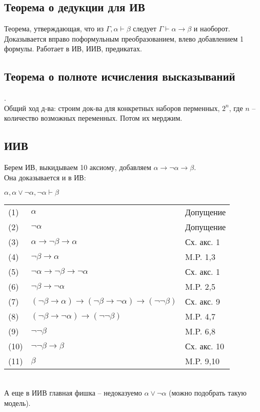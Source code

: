 \subsection{Теорема о дедукции для ИВ}
\label{sec-2-3}
Теорема, утверждающая, что из $\Gamma, \alpha \vdash \beta$ следует $\Gamma \vdash \alpha \to \beta$ и наоборот.\\
Доказывается вправо поформульным преобразованием, влево
добавлением 1 формулы. Работает в ИВ, ИИВ, предикатах.
\subsection{Теорема о полноте исчисления высказываний}
\label{sec-2-4}
.\\
Общий ход д-ва: строим док-ва для конкретных наборов перменных,
$2^n$, где $n$ -- количество возможных переменных. Потом их мерджим.
\subsection{ИИВ}
\label{sec-2-5}
Берем ИВ, выкидываем 10 аксиому, добавляем $\alpha \rightarrow \neg \alpha \rightarrow \beta$.\\
Она доказывается и в ИВ:
\begin{lemma}
$\alpha, \alpha \vee \neg \alpha, \neg \alpha \vdash \beta$
\end{lemma}
\begin{tabular}{lll}
(1) & $\alpha$& Допущение\\
(2) & $\neg \alpha$& Допущение\\
(3) & $\alpha \rightarrow \neg \beta \rightarrow \alpha$& Сх. акс. 1\\
(4) & $\neg \beta \rightarrow \alpha$& M.P. 1,3\\
(5) & $\neg \alpha \rightarrow \neg \beta \rightarrow \neg \alpha$& Сх. акс. 1\\
(6) & $\neg \beta \rightarrow \neg \alpha$& M.P. 2,5\\
(7) & $(\neg \beta \rightarrow \alpha) \rightarrow (\neg \beta \rightarrow \neg \alpha) \rightarrow (\neg \neg \beta)$& Сх. акс. 9\\
(8) & $(\neg \beta \rightarrow \neg \alpha) \rightarrow (\neg \neg \beta)$& M.P. 4,7\\
(9) & $\neg \neg \beta$& M.P. 6,8\\
(10) & $\neg \neg \beta \rightarrow \beta$& Сх. акс. 10\\
(11) & $\beta$& M.P. 9,10\\
\end{tabular}\\
А еще в ИИВ главная фишка -- недоказуемо $\alpha \lor \lnot \alpha$ (можно подобрать такую модель).
